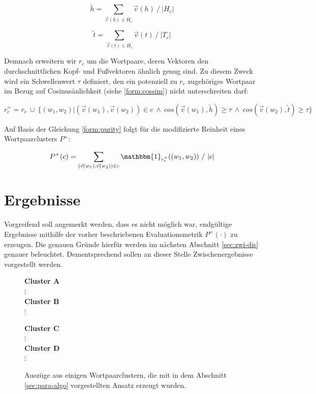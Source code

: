 \begin{equation}
  \tilde{h} = \sum_{\vec{v}(h) \in H_c} \vec{v}(h)\ /\ |H_c|
\end{equation}

\begin{equation}
  \tilde{t} = \sum_{\vec{v}(t) \in H_c} \vec{v}(t)\ /\ |T_c|
\end{equation}

Demnach erweitern wir $r_c$ um die Wortpaare, deren Vektoren den durchschnittlichen Kopf- und Fußvektoren ähnlich genug sind.
Zu diesem Zweck wird ein Schwellenwert $\tau$ definiert, den ein potenziell zu $r_c$ zugehöriges Wortpaar im Bezug auf
Cosinusänlichkeit (siehe \ref{form:cossim}) nicht unterschreiten darf:

\begin{equation}
  r_c^+ = r_c\ \cup\ \{(w_1, w_2)| (\vec{v}(w_1), \vec{v}(w_2)) \in c\ \land\ cos(\vec{v}(w_1), \tilde{h}) \geq \tau\ \land\ cos(\vec{v}(w_2), \tilde{t}) \geq \tau\}
\end{equation}

Auf Basis der Gleichung \ref{form:purity} folgt für die modifizierte Reinheit eines Wortpaarclusters $P^+$:

\begin{equation}
  P^+(c) = \sum_{(\vec{v}(w_1), \vec{v}(w_2)) \in c} \mathbbm{1}_{r_c^+}((w_1, w_2))\ /\ |c|
\end{equation}

\section{Ergebnisse}

Vorgreifend soll angemerkt werden, dass es nicht möglich war, endgültige Ergebnisse mithilfe der vorher beschriebenen
Evaluationsmetrik $P^+(\cdot)$ zu erzeugen. Die genauen Gründe hierfür werden im nächsten Abschnitt \ref{sec:zwi-dis}
genauer beleuchtet. Dementsprechend sollen an dieser Stelle Zwischenergebnisse vorgestellt werden.\\

\begin{figure}[h]
  \centering
  \begin{multicols}{2}
    \textbf{Cluster A}\\
    $\vdots$\\
    \columnbreak
    \textbf{Cluster B}\\
    $\vdots$\\
  \end{multicols}
  \begin{multicols}{2}
    \textbf{Cluster C}\\
    $\vdots$\\
    \columnbreak
    \textbf{Cluster D}\\
    $\vdots$\\
  \end{multicols}
  \caption[Auszug aus verschiedenen Wortpaarclustern]{Auszüge aus einigen Wortpaarclustern, die mit in dem Abschnitt
  \ref{sec:para-algo} vorgestellten Ansatz erzeugt wurden.\label{fig:clusters}}
\end{figure}


